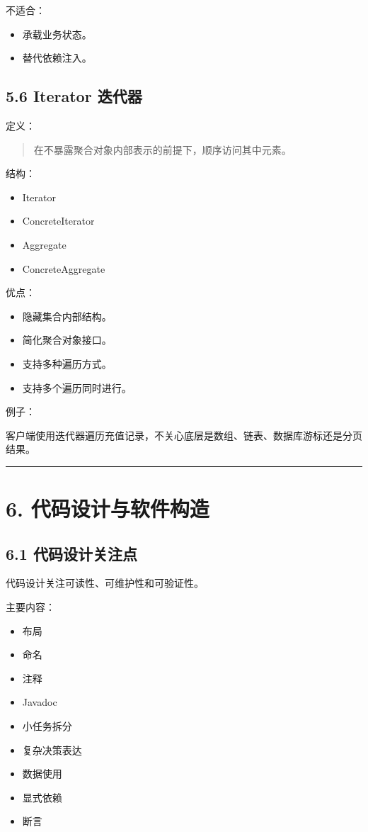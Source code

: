 \documentclass[UTF8,zihao=-4]{ctexart}
\begin{document}
不适合：

\begin{itemize}
\item 承载业务状态。
\item 替代依赖注入。
\end{itemize}

\subsection{5.6 Iterator 迭代器}

定义：

\begin{quote}
在不暴露聚合对象内部表示的前提下，顺序访问其中元素。
\end{quote}

结构：

\begin{itemize}
\item Iterator
\item ConcreteIterator
\item Aggregate
\item ConcreteAggregate
\end{itemize}

优点：

\begin{itemize}
\item 隐藏集合内部结构。
\item 简化聚合对象接口。
\item 支持多种遍历方式。
\item 支持多个遍历同时进行。
\end{itemize}

例子：

客户端使用迭代器遍历充值记录，不关心底层是数组、链表、数据库游标还是分页结果。

\bigskip\hrule\bigskip

\section{6. 代码设计与软件构造}

\subsection{6.1 代码设计关注点}

代码设计关注可读性、可维护性和可验证性。

主要内容：

\begin{itemize}
\item 布局
\item 命名
\item 注释
\item Javadoc
\item 小任务拆分
\item 复杂决策表达
\item 数据使用
\item 显式依赖
\item 断言
\end{itemize}
\end{document}
